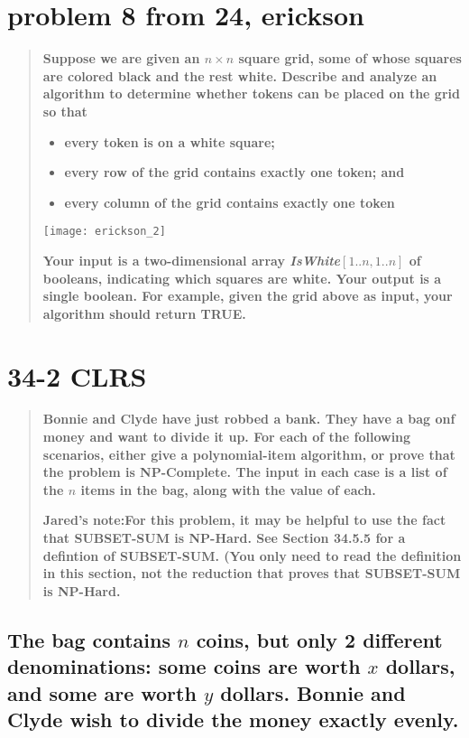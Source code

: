 \documentclass[titlepage]{article}\usepackage[]{graphicx}\usepackage[]{color}
\begin{document}
\section{problem 8 from 24, erickson}
\begin{quote}
  \textbf{Suppose we are given an $n \times n$ square grid, some of whose
    squares are colored black and the rest white. Describe and analyze an
  algorithm to determine whether tokens can be placed on the grid so that }
  \begin{itemize}
    \item \textbf{every token is on a white square;}
    \item \textbf{every row of the grid contains exactly one token; and}
      \item \textbf{every column of the grid contains exactly one token}
    \end{itemize}
      \texttt{[image: erickson\_2]}
      
    \textbf{ Your input is a two-dimensional array 
      \textit{IsWhite}$[1 .. n, 1 .. n]$ of booleans, indicating which
      squares are white. Your output is a single boolean. For example, given
    the grid above as input, your algorithm should return TRUE. }
    \end{quote}
    \newpage


\section{34-2 CLRS }
\begin{quote}
  \textbf{Bonnie and Clyde have just robbed a bank. They have a bag onf money
    and want to divide it up. For each of the following scenarios, either give
    a polynomial-item algorithm, or prove that the problem is NP-Complete. The
    input in each case is a list of the $n$ items in the bag, along with the
  value of each.}

  \textbf{ Jared's note:For this problem, it may be helpful to use the fact that SUBSET-SUM
    is NP-Hard. See Section 34.5.5 for a defintion of SUBSET-SUM. (You only
    need to read the definition in this section, not the reduction that proves
    that SUBSET-SUM is NP-Hard.} 
\end{quote}
\subsection{The bag contains $n$ coins, but only 2 different denominations:
  some coins are worth $x$ dollars, and some are worth $y$ dollars. Bonnie and
Clyde wish to divide the money exactly evenly.}
\vspace{5cm}
\end{document}
